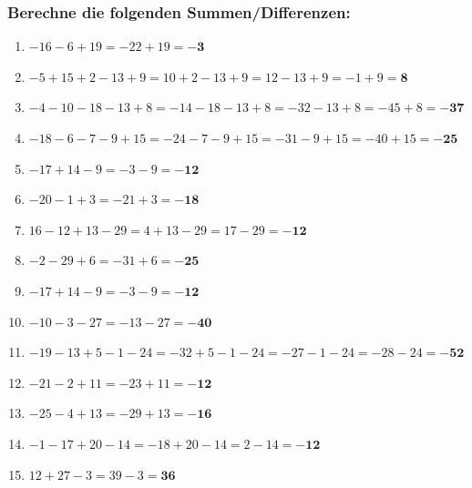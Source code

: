\documentclass[a4paper,12pt]{article} %
\begin{document}
\subsubsection{Berechne die folgenden Summen/Differenzen:} %

\begin{enumerate}

  \item \(-16 - 6 + 19 = -22 + 19 = \mathbf{-3}\) %

  \item \(-5 + 15 + 2 - 13 + 9 = 10 + 2 - 13 + 9 = 12 - 13 + 9 = -1 + 9 = \mathbf{8}\) %

  \item \(-4 - 10 - 18 - 13 + 8 = -14 - 18 - 13 + 8 = -32 - 13 + 8 = -45 + 8 = \mathbf{-37}\) %

  \item \(-18 - 6 - 7 - 9 + 15 = -24 - 7 - 9 + 15 = -31 - 9 + 15 = -40 + 15 = \mathbf{-25}\) %

  \item \(-17 + 14 - 9 = -3 - 9 = \mathbf{-12}\) %

  \item \(-20 - 1 + 3 = -21 + 3 = \mathbf{-18}\) %

  \item \(16 - 12 + 13 - 29 = 4 + 13 - 29 = 17 - 29 = \mathbf{-12}\) %

  \item \(-2 - 29 + 6 = -31 + 6 = \mathbf{-25}\) %

  \item \(-17 + 14 - 9 = -3 - 9 = \mathbf{-12}\) %

  \item \(-10 - 3 - 27 = -13 - 27 = \mathbf{-40}\) %

  \item \(-19 - 13 + 5 - 1 - 24 = -32 + 5 - 1 - 24 = -27 - 1 - 24 = -28 - 24 = \mathbf{-52}\) %

  \item \(-21 - 2 + 11 = -23 + 11 = \mathbf{-12}\) %

  \item \(-25 - 4 + 13 = -29 + 13 = \mathbf{-16}\) %

  \item \(-1 - 17 + 20 - 14 = -18 + 20 - 14 = 2 - 14 = \mathbf{-12}\) %

  \item \(12 + 27 - 3 = 39 - 3 = \mathbf{36}\) %


\end{enumerate}
\end{document}
